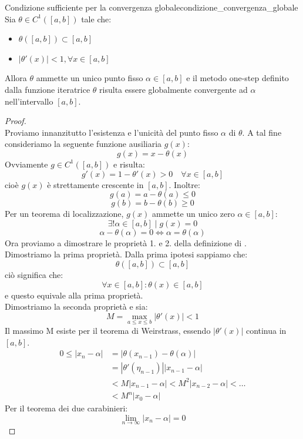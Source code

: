 \documentclass[12pt]{report}
\newcounter{theorem}
\newcommand{\namerefl}[1]{%
	\bgroup
	\let\nmu\MakeLowercase
	\nameref{#1}\egroup}
\newcommand{\nmu}{}
\begin{document}
\begin{theorem}{\nmu Condizione sufficiente per la convergenza globale}{condizione_convergenza_globale}
	Sia $\theta \in C^1([a, b])$ tale che:
	\begin{itemize}
		\item $\theta([a, b]) \subset [a, b]$
		\item $|\theta'(x)| < 1, \forall x \in [a, b]$
	\end{itemize}
	Allora $\theta$ ammette un unico punto fisso $\alpha \in [a, b]$ e il metodo one-step definito dalla funzione iteratrice $\theta$ risulta essere globalmente convergente ad $\alpha$ nell'intervallo $[a, b]$.
\end{theorem}
\begin{proof} \quad \\
	Proviamo innanzitutto l'esistenza e l'unicità del punto fisso $\alpha$ di $\theta$. A tal fine consideriamo la seguente funzione ausiliaria $g(x)$:
	\[
	g(x) = x - \theta(x)
	\]
	Ovviamente $g \in C^1([a, b])$ e risulta:
	\[
	g'(x) = 1 - \theta'(x) > 0 \quad \forall x \in [a, b]
	\]
	cioè $g(x)$ è strettamente crescente in $[a, b]$. Inoltre:
	\[
	g(a) = a - \theta(a) \leq 0
	\]
	\[
	g(b) = b - \theta(b) \geq 0
	\]
	Per un teorema di localizzazione, $g(x)$ ammette un unico zero $\alpha \in [a, b]$:
	\[
	\exists! \alpha \in [a, b] \mid g(x) = 0
	\]
	\[
	\alpha - \theta(\alpha) = 0 \iff \alpha = \theta(\alpha)
	\]
	Ora proviamo a dimostrare le proprietà 1. e 2. della definizione di \namerefl{def:convergenza_globale}. \\
	Dimostriamo la prima proprietà. Dalla prima ipotesi sappiamo che:
	\[
	\theta([a, b]) \subset [a, b]
	\]
	ciò significa che:
	\[
	\forall x \in [a, b]: \theta(x) \in [a,b]
	\]
	e questo equivale alla prima proprietà. \\
	Dimostriamo la seconda proprietà e sia:
	\[
	M = \max_{a \leq x \leq b}|\theta'(x)| < 1
	\]
	Il massimo M esiste per il teorema di Weirstrass, essendo $|\theta'(x)|$ continua in $[a, b]$.
	\begin{align*}
		0 \leq |x_n - \alpha| &= |\theta(x_{n- 1}) - \theta(\alpha)| \\
		&= |\theta'(\eta_{n-1})||x_{n-1} -\alpha| \\
		&< M|x_{n-1}-\alpha| < M^2|x_{n-2}-\alpha| < \dots \\
		&< M^n|x_0 - \alpha|
	\end{align*}
	Per il teorema dei due carabinieri:
	\[
	\lim\limits_{n\to\infty}|x_n-\alpha| = 0
	\]
\end{proof}
\end{document}
